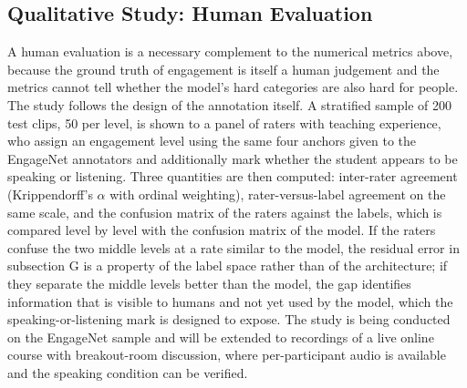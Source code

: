 \documentclass[journal]{IEEEtran}
\begin{document}
\subsection{Qualitative Study: Human Evaluation}

A human evaluation is a necessary complement to the numerical metrics above, because the ground truth of engagement is itself a human judgement and the metrics cannot tell whether the model's hard categories are also hard for people. The study follows the design of the annotation itself. A stratified sample of 200 test clips, 50 per level, is shown to a panel of raters with teaching experience, who assign an engagement level using the same four anchors given to the EngageNet annotators and additionally mark whether the student appears to be speaking or listening. Three quantities are then computed: inter-rater agreement (Krippendorff's $\alpha$ with ordinal weighting), rater-versus-label agreement on the same scale, and the confusion matrix of the raters against the labels, which is compared level by level with the confusion matrix of the model. If the raters confuse the two middle levels at a rate similar to the model, the residual error in subsection G is a property of the label space rather than of the architecture; if they separate the middle levels better than the model, the gap identifies information that is visible to humans and not yet used by the model, which the speaking-or-listening mark is designed to expose. The study is being conducted on the EngageNet sample and will be extended to recordings of a live online course with breakout-room discussion, where per-participant audio is available and the speaking condition can be verified.


%
%
\end{document}
